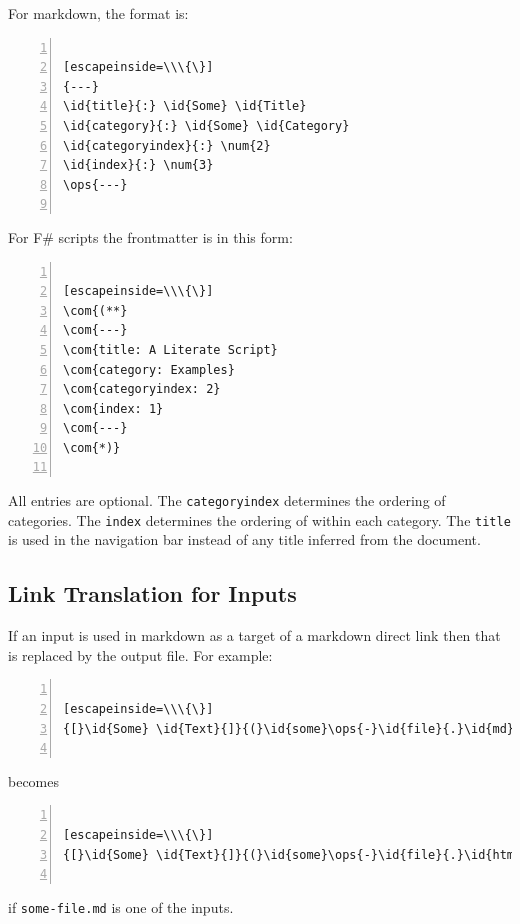 \documentclass{article}
\newcommand{\id}[1]{\textcolor{black}{#1}}
\newcommand{\com}[1]{\textcolor{officegreen}{#1}}
\newcommand{\num}[1]{\textcolor{officegreen}{#1}}
\newcommand{\ops}[1]{\textcolor{purple}{#1}}
\begin{document}
For markdown, the format is:
\begin{lstlisting}[numbers=left]

[escapeinside=\\\{\}]
{---}
\id{title}{:} \id{Some} \id{Title}
\id{category}{:} \id{Some} \id{Category}
\id{categoryindex}{:} \num{2}
\id{index}{:} \num{3}
\ops{---}


\end{lstlisting}



For F\# scripts the frontmatter is in this form:
\begin{lstlisting}[numbers=left]

[escapeinside=\\\{\}]
\com{(**}
\com{---}
\com{title: A Literate Script}
\com{category: Examples}
\com{categoryindex: 2}
\com{index: 1}
\com{---}
\com{*)}


\end{lstlisting}



All entries are optional.
The \texttt{categoryindex} determines the ordering of categories.
The \texttt{index} determines the ordering of within each category.
The \texttt{title} is used in the navigation bar instead of any title inferred from the document.
\subsection*{Link Translation for Inputs}



If an input is used in markdown as a target of a markdown direct link then that is replaced by the output file. For example:
\begin{lstlisting}[numbers=left]

[escapeinside=\\\{\}]
{[}\id{Some} \id{Text}{]}{(}\id{some}\ops{-}\id{file}{.}\id{md}{)}


\end{lstlisting}



becomes
\begin{lstlisting}[numbers=left]

[escapeinside=\\\{\}]
{[}\id{Some} \id{Text}{]}{(}\id{some}\ops{-}\id{file}{.}\id{html}{)}


\end{lstlisting}



if \texttt{some-file.md} is one of the inputs.
\end{document}
